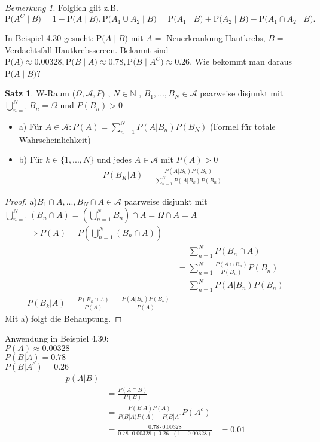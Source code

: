 \documentclass[a4paper,12pt,fleqn]{scrartcl}
\newcommand{\m}[1]{\mathcal{ #1 }}
\newcommand{\p}[1]{\text{P(} #1 \text{)}}
\theoremstyle{definition}
\newtheorem{satz}[definition]{Satz}
\theoremstyle{plain}
\theoremstyle{remark}
\newtheorem*{bemerkung}{Bemerkung}
\begin{document}
\begin{bemerkung}
Folglich gilt z.B. $\p{A^C \mid B} = 1 - \p{A \mid B}, \p{A_1 \cup A_2 \mid B} = \p{A_1 \mid B} + \p{A_2 \mid B} - \p{A_1 \cap A_2 \mid B}.$
\end{bemerkung}
In Beispiel 4.30 gesucht: $\p{A \mid B}$ mit $A=$ \glqq Neuerkrankung Hautkrebs\grqq, $B=$ \glqq Verdachtsfall Hautkrebsscreen\grqq. Bekannt sind $\p{A} \approx 0.00328, \p{B \mid A} \approx 0.78, \p{B \mid A^C} \approx 0.26$. Wie bekommt man daraus $\p{A \mid B}$?

\begin{satz}
W-Raum ($ \Omega, \m{A}, P $) , $N \in \mathbb{N}$ , $B_1 , ... , B_N \in \m{A}$ paarweise disjunkt mit $\bigcup_{n = 1}^{N}{B_n} = \Omega$ und $P(B_n) > 0 $
\begin{itemize}
\item a) Für $A \in \m{A}: P(A) = \sum_{n=1}^{N}{P(A|B_n)P(B_N)}$ (Formel für totale Wahrscheinlichkeit)
\item b) Für $k \in \{ 1,...,N \} $ und jedes $A \in \m{A}$ mit $P(A) > 0$
\begin{align*}
P(B_K | A) = \frac{P(A|B_k)P(B_k)}{\sum_{n=1}^{N}{P(A|B_k)P(B_n)}}
\end{align*}
\end{itemize} 
\end{satz}
\begin{proof}
a)$B_1 \cap A,...,B_N \cap A \in \m{A}$ paarweise disjunkt mit 
 $ \bigcup_{n=1}^{N}{(B_n \cap A)} = ( \bigcup_{n=1}^{N}{B_n}) \cap A = \Omega \cap A = A $
\begin{align*} %
\Rightarrow P(A) = P( \bigcup_{n=1}^{N}{(B_n \cap A)} ) \\
 &= \sum_{n=1}^{N}{P(B_n \cap A)} \\
 &= \sum_{n=1}^{N}{ \frac{P(A \cap B_n)}{P(B_n)}P(B_n)} \\
 &= \sum_{n=1}^{N}{P(A|B_n)P(B_n)} \\
 P(B_k|A) = \frac{P(B_k \cap A)}{P(A)} = \frac{P(A|B_k)P(B_k)}{P(A)}
\end{align*}
Mit a) folgt die Behauptung.
\end{proof}

Anwendung in Beispiel 4.30: \\
$P(A) \approx 0.00328$ \\
$P(B | A ) = 0.78 $\\
$P(B|A^c) = 0.26$ \\

\begin{align*}
p(A|B) \\
&= \frac{P(A \cap B)}{P(B)} \\
&= \frac{P(B|A)P(A)}{P(B|A)P(A)+P(B|A^c}P(A^c) \\
&= \frac{0.78 \cdot 0.00328}{0.78 \cdot 0.00328 + 0.26 \cdot (1-0.00328)}
&= 0.01 
\end{align*}
\end{document}
